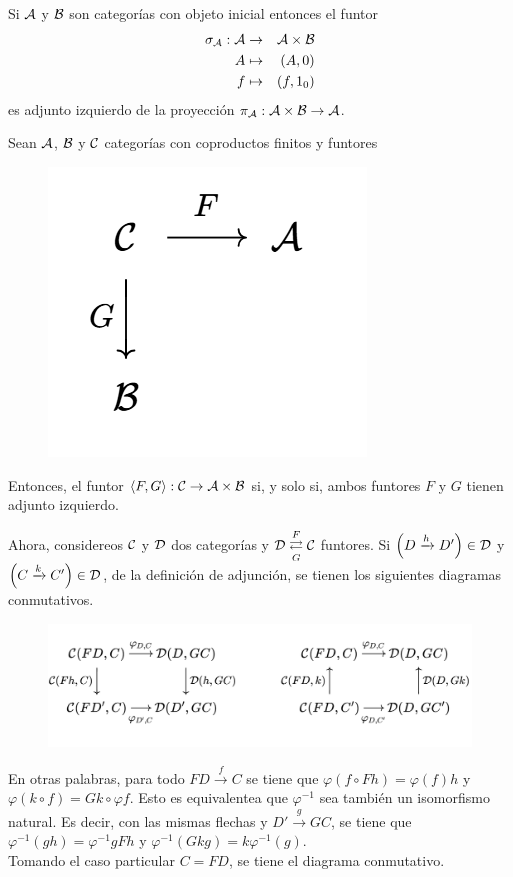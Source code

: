 \begin{prop}
    Si ${\mathcal A}$ y ${\mathcal B}$ son categorías con objeto inicial entonces el funtor 
    \begin{eqnarray*}
    \sigma_{\mathcal A}:{\mathcal A}&\to&{\mathcal A}\times {\mathcal B}\\
    A&\mapsto& (A,0)\\
    f&\mapsto& (f,1_0)
  \end{eqnarray*}
  es adjunto izquierdo de la proyección $\pi_{\mathcal A}:{\mathcal A}\times{\mathcal B}\to{\mathcal A}$.
\end{prop}
\begin{prop}
    Sean ${\mathcal A}$, ${\mathcal B}$ y ${\mathcal C}$ categorías con coproductos finitos y funtores 
    \begin{figure}[H]
        \centering
        \includegraphics[width=0.18\linewidth]{img/diagram1.4.1.png}
    \end{figure}
    Entonces, el funtor $\langle F,G\rangle:{\mathcal C}\to{\mathcal A}\times{\mathcal B}$ si, y solo si, ambos funtores $F$ y $G$ tienen adjunto izquierdo.
\end{prop}
Ahora, considereos ${\mathcal C}$ y ${\mathcal D}$ dos categorías y ${\mathcal D}\overset{F}{\underset{G}{\rightleftarrows}}{\mathcal C}$ funtores. Si $\left(D\xrightarrow{h}D'\right)\in{\mathcal D}$ y $\left(C\xrightarrow{k}C'\right)\in {\mathcal D}$, de la definición de adjunción, se tienen los siguientes diagramas conmutativos.
    \begin{figure}[H]
        \centering
        \includegraphics[width=0.8\linewidth]{img/diagram1.4.2.png}
    \end{figure}
    En otras palabras, para todo $FD\xrightarrow{f}C$ se tiene que $\varphi(f\circ Fh)=\varphi(f)h$ y $\varphi(k\circ f)=Gk\circ\varphi f$. Esto es equivalentea que $\varphi^{-1}$ sea también un isomorfismo natural. Es decir, con las mismas flechas y $D'\xrightarrow{g} GC$, se tiene que $\varphi^{-1}(gh)=\varphi^{-1}gFh$ y $\varphi^{-1}(Gkg)=k\varphi^{-1}(g)$. \\
    Tomando el caso particular $C=FD$, se tiene el diagrama conmutativo.
